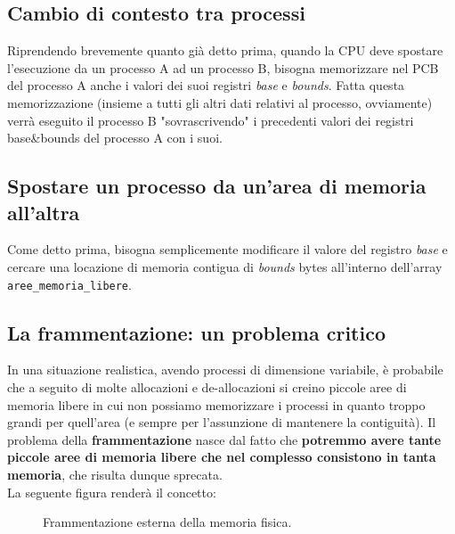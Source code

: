 \documentclass[12pt]{report}
\begin{document}
	\subsection{Cambio di contesto tra processi}
	Riprendendo brevemente quanto già detto prima, quando la CPU deve spostare l'esecuzione da un processo A ad un processo B, bisogna memorizzare nel PCB del processo A anche i valori dei suoi registri \textit{base} e \textit{bounds}. Fatta questa memorizzazione (insieme a tutti gli altri dati relativi al processo, ovviamente) verrà eseguito il processo B "sovrascrivendo" i precedenti valori dei registri base\&bounds del processo A con i suoi.
	
	\subsection{Spostare un processo da un'area di memoria all'altra}
	Come detto prima, bisogna semplicemente modificare il valore del registro \textit{base} e cercare una locazione di memoria contigua di \textit{bounds} bytes all'interno dell'array \texttt{aree\_memoria\_libere}.
	
	\subsection{La frammentazione: un problema critico}
	In una situazione realistica, avendo processi di dimensione variabile, è probabile che a seguito di molte allocazioni e de-allocazioni si creino piccole aree di memoria libere in cui non possiamo memorizzare i processi in quanto troppo grandi per quell'area (e sempre per l'assunzione di mantenere la contiguità). Il problema della \textbf{frammentazione} nasce dal fatto che \textbf{potremmo avere tante piccole aree di memoria libere che nel complesso consistono in tanta memoria}, che risulta dunque sprecata.\\
	La seguente figura renderà il concetto:
	
	\begin{figure}[htbp]
		\centering
		\caption{Frammentazione esterna della memoria fisica.}
		\label{fig:frammentazione_esterna}
	\end{figure}
	
\end{document}
